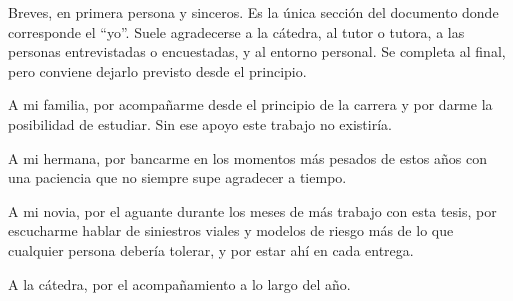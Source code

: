 
\begin{guia}
Breves, en primera persona y sinceros. Es la única sección del documento
donde corresponde el ``yo''. Suele agradecerse a la cátedra, al tutor o
tutora, a las personas entrevistadas o encuestadas, y al entorno personal.
Se completa al final, pero conviene dejarlo previsto desde el principio.
\end{guia}

A mi familia, por acompañarme desde el principio de la carrera y por darme la posibilidad de estudiar. Sin ese apoyo este trabajo no existiría.

A mi hermana, por bancarme en los momentos más pesados de estos años con una paciencia que no siempre supe agradecer a tiempo.

A mi novia, por el aguante durante los meses de más trabajo con esta tesis, por escucharme hablar de siniestros viales y modelos de riesgo más de lo que cualquier persona debería tolerar, y por estar ahí en cada entrega.

A la cátedra, por el acompañamiento a lo largo del año.
